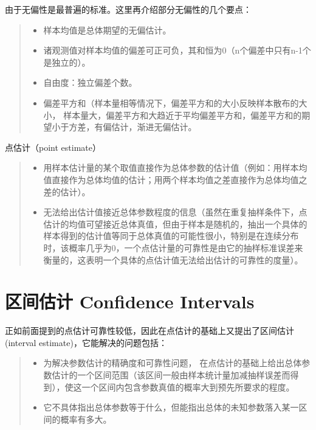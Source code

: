 \documentclass[]{ctexbook}
\providecommand{\tightlist}{%
  \setlength{\itemsep}{0pt}\setlength{\parskip}{0pt}}
\begin{document}
由于无偏性是最普遍的标准。这里再介绍部分无偏性的几个要点：

\begin{quote}
\begin{itemize}
\tightlist
\item
  样本均值是总体期望的无偏估计。
\item
  诸观测值对样本均值的偏差可正可负，其和恒为0（n个偏差中只有n-1个是独立的）。
\item
  自由度：独立偏差个数。
\item
  偏差平方和（样本量相等情况下，偏差平方和的大小反映样本散布的大小， 样本量大，偏差平方和大趋近于平均偏差平方和，偏差平方和的期望小于方差，有偏估计，渐进无偏估计。
\end{itemize}
\end{quote}

点估计（point estimate）

\begin{quote}
\begin{itemize}
\tightlist
\item
  用样本估计量的某个取值直接作为总体参数的估计值（例如：用样本均值直接作为总体均值的估计；用两个样本均值之差直接作为总体均值之差的估计）。
\item
  无法给出估计值接近总体参数程度的信息（虽然在重复抽样条件下，点估计的均值可望接近总体真值，但由于样本是随机的，抽出一个具体的样本得到的估计值等同于总体真值的可能性很小，特别是在连续分布时，该概率几乎为0，一个点估计量的可靠性是由它的抽样标准误差来衡量的，这表明一个具体的点估计值无法给出估计的可靠性的度量）。
\end{itemize}
\end{quote}

\hypertarget{ux533aux95f4ux4f30ux8ba1-confidence-intervals}{%
\section{区间估计 Confidence Intervals}\label{ux533aux95f4ux4f30ux8ba1-confidence-intervals}}

正如前面提到的点估计可靠性较低，因此在点估计的基础上又提出了区间估计(interval estimate)，它能解决的问题包括：

\begin{quote}
\begin{itemize}
\tightlist
\item
  为解决参数估计的精确度和可靠性问题， 在点估计的基础上给出总体参数估计的一个区间范围（该区间一般由样本统计量加减抽样误差而得到），使这一个区间内包含参数真值的概率大到预先所要求的程度。
\item
  它不具体指出总体参数等于什么，但能指出总体的未知参数落入某一区间的概率有多大。
\end{itemize}
\end{quote}
\end{document}

